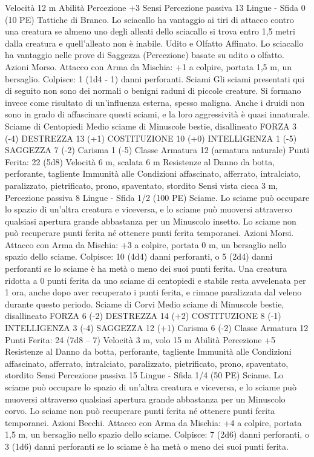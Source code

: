 \begin{multicols}{2}
Velocità 12 m
Abilità Percezione +3
Sensi Percezione passiva 13
Lingue -
Sfida 0 (10 PE)
Tattiche di Branco. Lo sciacallo ha vantaggio ai tiri di attacco
contro una creatura se almeno uno degli alleati dello sciacallo si
trova entro 1,5 metri dalla creatura e quell’alleato non è inabile.
Udito e Olfatto Affinato. Lo sciacallo ha vantaggio nelle prove
di Saggezza (Percezione) basate su udito o olfatto.
Azioni
Morso. Attacco con Arma da Mischia: +1 a colpire, portata 1,5
m, un bersaglio.
Colpisce: 1 (1d4 - 1) danni perforanti.
Sciami
Gli sciami presentati qui di seguito non sono dei normali
o benigni raduni di piccole creature. Si formano invece
come risultato di un’influenza esterna, spesso maligna.
Anche i druidi non sono in grado di affascinare questi
sciami, e la loro aggressività è quasi innaturale.
Sciame di Centopiedi
Medio sciame di Minuscole bestie, disallineato
FORZA 3 (-4)
DESTREZZA 13 (+1)
COSTITUZIONE 10 (+0)
INTELLIGENZA 1 (-5)
SAGGEZZA 7 (-2)
Carisma 1 (-5)
Classe Armatura 12 (armatura naturale)
\hspace*{0pt}\hfill{Punti Ferita}: 22 (5d8)
Velocità 6 m, scalata 6 m
Resistenze al Danno da botta, perforante, tagliente
Immunità alle Condizioni affascinato, afferrato, intralciato,
paralizzato, pietrificato, prono, spaventato, stordito
Sensi vista cieca 3 m, Percezione passiva 8
Lingue -
Sfida 1/2 (100 PE)
Sciame. Lo sciame può occupare lo spazio di un’altra creatura e
viceversa, e lo sciame può muoversi attraverso qualsiasi apertura
grande abbastanza per un Minuscolo insetto. Lo sciame non può
recuperare punti ferita né ottenere punti ferita temporanei.
Azioni
Morsi. Attacco con Arma da Mischia: +3 a colpire, portata 0 m,
un bersaglio nello spazio dello sciame.
Colpisce: 10 (4d4) danni perforanti, o 5 (2d4) danni perforanti se
lo sciame è ha metà o meno dei suoi punti ferita. Una creatura
ridotta a 0 punti ferita da uno sciame di centopiedi e stabile resta
avvelenata per 1 ora, anche dopo aver recuperato i punti ferita, e
rimane paralizzata dal veleno durante questo periodo.
Sciame di Corvi
Medio sciame di Minuscole bestie, disallineato
FORZA 6 (-2)
DESTREZZA 14 (+2)
COSTITUZIONE 8 (-1)
INTELLIGENZA 3 (-4)
SAGGEZZA 12 (+1)
Carisma 6 (-2)
Classe Armatura 12
\hspace*{0pt}\hfill{Punti Ferita}: 24 (7d8 – 7)
Velocità 3 m, volo 15 m
Abilità Percezione +5
Resistenze al Danno da botta, perforante, tagliente
Immunità alle Condizioni affascinato, afferrato, intralciato,
paralizzato, pietrificato, prono, spaventato, stordito
Sensi Percezione passiva 15
Lingue -
Sfida 1/4 (50 PE)
Sciame. Lo sciame può occupare lo spazio di un’altra creatura e
viceversa, e lo sciame può muoversi attraverso qualsiasi apertura
grande abbastanza per un Minuscolo corvo. Lo sciame non può
recuperare punti ferita né ottenere punti ferita temporanei.
Azioni
Becchi. Attacco con Arma da Mischia: +4 a colpire, portata 1,5
m, un bersaglio nello spazio dello sciame.
Colpisce: 7 (2d6) danni perforanti, o 3 (1d6) danni perforanti se
lo sciame è ha metà o meno dei suoi punti ferita.
 

\end{multicols}
